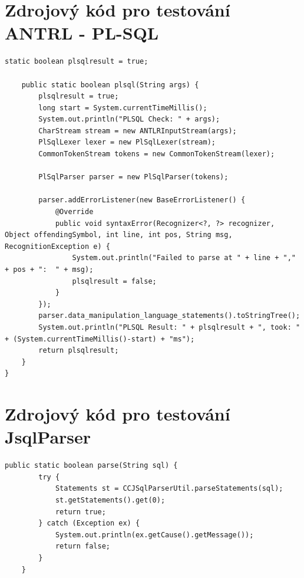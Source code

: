 \documentclass[czech,bachelor,public,dept460,male,cpdeclaration,twoside]{diploma}
\begin{document}
\section{Zdrojový kód pro testování ANTRL - PL-SQL}
\begin{lstlisting}[caption=ANTRL PL-SQL]
    static boolean plsqlresult = true;

    public static boolean plsql(String args) {
        plsqlresult = true;
        long start = System.currentTimeMillis();
        System.out.println("PLSQL Check: " + args);
        CharStream stream = new ANTLRInputStream(args);
        PlSqlLexer lexer = new PlSqlLexer(stream);
        CommonTokenStream tokens = new CommonTokenStream(lexer);

        PlSqlParser parser = new PlSqlParser(tokens);

        parser.addErrorListener(new BaseErrorListener() {
            @Override
            public void syntaxError(Recognizer<?, ?> recognizer, Object offendingSymbol, int line, int pos, String msg, RecognitionException e) {
                System.out.println("Failed to parse at " + line + "," + pos + ":  " + msg);
                plsqlresult = false;
            }
        });
        parser.data_manipulation_language_statements().toStringTree();
        System.out.println("PLSQL Result: " + plsqlresult + ", took: " + (System.currentTimeMillis()-start) + "ms");
        return plsqlresult;
    }
}
\end{lstlisting}


\section{Zdrojový kód pro testování JsqlParser}
\begin{lstlisting}[caption=ANTRL JSQL]
    public static boolean parse(String sql) {
        try {
            Statements st = CCJSqlParserUtil.parseStatements(sql);
            st.getStatements().get(0);
            return true;
        } catch (Exception ex) {
            System.out.println(ex.getCause().getMessage());
            return false;
        }
    }
\end{lstlisting}
\end{document}

